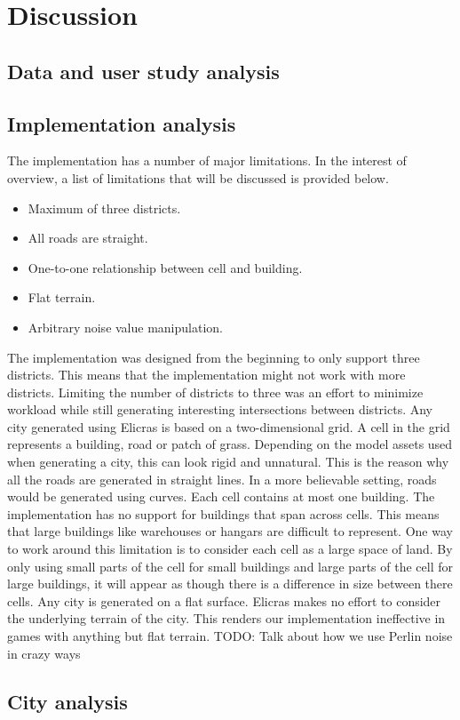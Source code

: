\section{Discussion}
	\subsection{Data and user study analysis}
	
	\subsection{Implementation analysis}
	The implementation has a number of major limitations. In the interest of overview, a list of limitations that will be discussed is provided below.
	
	\begin{itemize}
		\item Maximum of three districts.
		\item All roads are straight.
		\item One-to-one relationship between cell and building.
		\item Flat terrain.
		\item Arbitrary noise value manipulation.
	\end{itemize}
	
	The implementation was designed from the beginning to only support three districts. This means that the implementation might not work with more districts. Limiting the number of districts to three was an effort to minimize workload while still generating interesting intersections between districts.
	Any city generated using Elicras is based on a two-dimensional grid. A cell in the grid represents a building, road or patch of grass. Depending on the model assets used when generating a city, this can look rigid and unnatural. This is the reason why all the roads are generated in straight lines. In a more believable setting, roads would be generated using curves. %
	Each cell contains at most one building. The implementation has no support for buildings that span across cells. This means that large buildings like warehouses or hangars are difficult to represent. One way to work around this limitation is to consider each cell as a large space of land. By only using small parts of the cell for small buildings and large parts of the cell for large buildings, it will appear as though there is a difference in size between there cells.
	Any city is generated on a flat surface. Elicras makes no effort to consider the underlying terrain of the city. This renders our implementation ineffective in games with anything but flat terrain.
	TODO: Talk about how we use Perlin noise in crazy ways
	
	\subsection{City analysis}